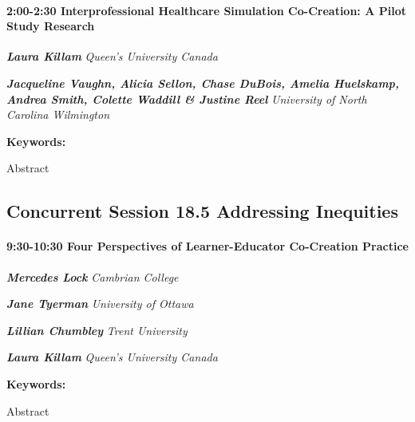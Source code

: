 \documentclass[
]{book}
\begin{document}
\begin{session}
\hypertarget{interprofessional-healthcare-simulation-co-creation-a-pilot-study-research}{%
\paragraph*{\texorpdfstring{2:00-2:30 \textbar{}
\textbf{Interprofessional Healthcare Simulation Co-Creation: A Pilot
Study} \textbar{}
Research}{2:00-2:30 \textbar{} Interprofessional Healthcare Simulation Co-Creation: A Pilot Study \textbar{} Research}}\label{interprofessional-healthcare-simulation-co-creation-a-pilot-study-research}}

\textbf{\emph{Laura Killam}} \textbar{} \emph{Queen's University Canada}

\textbf{\emph{Jacqueline Vaughn, Alicia Sellon, Chase DuBois, Amelia
Huelskamp, Andrea Smith, Colette Waddill \& Justine Reel}} \textbar{}
\emph{University of North Carolina Wilmington}

\textbf{Keywords:}

Abstract
\end{session}

\hypertarget{concurrent-session-18.5-addressing-inequities}{%
\subsection*{Concurrent Session 18.5 \textbar{} Addressing Inequities}\label{concurrent-session-18.5-addressing-inequities}}

\begin{session}
\hypertarget{four-perspectives-of-learner-educator-co-creation-practice}{%
\paragraph*{\texorpdfstring{9:30-10:30 \textbar{} \textbf{Four
Perspectives of Learner-Educator Co-Creation} \textbar{}
Practice}{9:30-10:30 \textbar{} Four Perspectives of Learner-Educator Co-Creation \textbar{} Practice}}\label{four-perspectives-of-learner-educator-co-creation-practice}}

\textbf{\emph{Mercedes Lock}} \textbar{} \emph{Cambrian College}

\textbf{\emph{Jane Tyerman}} \textbar{} \emph{University of Ottawa}

\textbf{\emph{Lillian Chumbley}} \textbar{} \emph{Trent University}

\textbf{\emph{Laura Killam}} \textbar{} \emph{Queen's University Canada}

\textbf{Keywords:}

Abstract
\end{session}
\end{document}
